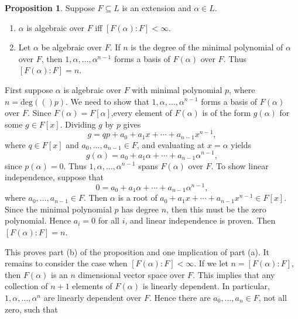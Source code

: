 \documentclass[leqno]{article}
\makeatletter
\newcommand{\deg}[1]{\text{deg}(#1)}
\theoremstyle{definition}
\newtheorem{prop}{Proposition}
\theoremstyle{remark}
\let\oldproofname=\proofname
\renewcommand{\proofname}{\textit{\oldproofname}}
\theoremstyle{definition}
\renewenvironment{proof}[1][\proofname]{\par
  \pushQED{\qed}%
  \normalfont \topsep6\p@\@plus6\p@\relax
  \list{}{\leftmargin=0mm
          \rightmargin=0mm
          \settowidth{\itemindent}{\itshape#1}%
          \labelwidth=\itemindent
          \parsep=0pt \listparindent=0mm%
  }
  \item[\hskip\labelsep
        \itshape
    #1\@addpunct{.}]\ignorespaces
}{%
  \popQED\endlist\@endpefalse
}
\makeatother
\begin{document}
    \begin{prop}\label{prop:1.2}
        Suppose $F\subseteq L$ is an extension and $\alpha\in L$.
            \begin{enumerate}[label=(\alph*)]
                \item $\alpha$ is algebraic over $F$ iff $[F(\alpha)\colon F]<\infty$.
                \item Let $\alpha$ be algebraic over $F$. If $n$ is the degree of the minimal polynomial of $\alpha$ over $F$, then $1,\alpha,\dots,\alpha^{n-1}$ forms a basis of $F(\alpha)$ over $F$. Thus $[F(\alpha)\colon F]=n$.
            \end{enumerate}
    \end{prop}
        \begin{proof}
            First suppose $\alpha$ is algebraic over $F$ with minimal polynomial $p$, where $n=\deg(p)$. We need to show that $1,\alpha,\dots,\alpha^{n-1}$ forms a basis of $F(\alpha)$ over $F$. Since $F(\alpha)=F[\alpha]$,every element of $F(\alpha)$ is of the form $g(\alpha)$ for some $g\in F[x]$. Dividing $g$ by $p$ gives
                \begin{equation*}
                    g=qp+a_0+a_1x+\cdots+a_{n-1}x^{n-1},
                \end{equation*}
            where $q\in F[x]$ and $a_0,\dots,a_{n-1}\in F$, and evaluating at $x=\alpha$ yields 
                \begin{equation*}
                    g(\alpha)=a_0+a_1\alpha+\cdots+a_{n-1}\alpha^{n-1},
                \end{equation*}
            since $p(\alpha)=0$. Thus $1,\alpha,\dots,\alpha^{n-1}$ spans $F(\alpha)$ over $F$. To show linear independence, suppose that 
                \begin{equation*}
                    0=a_0+a_1\alpha+\cdots+a_{n-1}\alpha^{n-1},
                \end{equation*}
            where $a_0,\dots,a_{n-1}\in F$. Then $\alpha$ is a root of $a_0+a_1x+\cdots+a_{n-1}x^{n-1}\in F[x]$. Since the minimal polynomial $p$ has degree $n$, then this must be the zero polynomial. Hence $a_i=0$ for all $i$, and linear independence is proven. Then $[F(\alpha)\colon F]=n$.\par\hspace{4mm}This proves part (b) of the proposition and one implication of part (a). It remains to consider the case when $[F(\alpha)\colon F]<\infty$. If we let $n=[F(\alpha)\colon F]$, then $F(\alpha)$ is an $n$ dimensional vector space over $F$. This implies that any collection of $n+1$ elements of $F(\alpha)$ is linearly dependent. In particular, $1,\alpha,\dots,\alpha^n$ are linearly dependent over $F$. Hence there are $a_0,\dots,a_n\in F$, not all zero, such that     \begin{equation*}

\end{equation*}
\end{proof}
\end{document}
